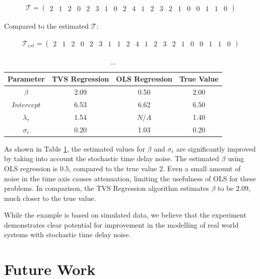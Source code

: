 \documentclass[11pt]{amsart}
\begin{document}
\begin{align}
\mathcal{T} = 
\left(
\begin{array}{cccccccccccccccccccc}
2 & 1 & 2 & 0 & 2 & 3 & 1 & 0 & 2 & 4 & 1 & 2 & 3 & 2 & 1 & 0  & 0 & 1 & 1 & 0 
\end{array}  
\right)
\end{align}
\newline

Compared to the estimated $\mathcal{T}$:

\begin{align}
\mathcal{T}_{est} = 
\left(
\begin{array}{cccccccccccccccccccc}   
2 & 1 & 2 & 0 & 2 & 3 & 1 & 1 & 2 & 4 & 1 & 2 & 3 & 2 & 1 & 0  & 0 & 1 & 1 & 0 
\end{array}  
\right)
\end{align}



\begin{center}
\begin{table}
\begin{tabular}{c|c|c|c|}
\hline
Parameter & TVS Regression & OLS Regression & True Value \\
\hline
$\beta$ & 2.09 & 0.50 & 2.00  \\
\hline
$Intercept$ & 6.53 & 6.62 & 6.50 \\
\hline
$\lambda_{\tau}$ & 1.54 & $N/A$ & 1.40 \\
\hline
$\sigma_{\epsilon}$ & 0.20 & 1.03 & 0.20 \\
\end{tabular}
\caption{ ... } 
\label{results_table}
\end{table}
\end{center}

As shown in Table \ref{results_table}, the estimated values for $\beta$ and $\sigma_{\epsilon}$ are significantly improved by taking into account the stochastic time delay noise. The estimated $\beta$ using OLS regression is $0.5$, compared to the true value $2$. Even a small amount of noise in the time axis causes attenuation, 
limiting the usefulness of OLS for these problems.
In comparison, the TVS Regression algorithm estimates $\beta$ to be $2.09$, much closer to the true value.

While the example is based on simulated data, we believe that the experiment demonstrates clear potential for improvement in the modelling of real world systems with stochastic time delay noise.


\section{Future Work}
\end{document}

